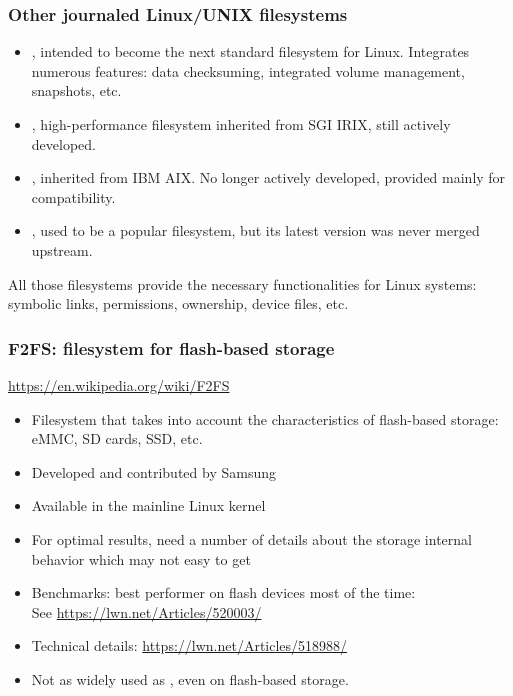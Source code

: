 \begin{frame}
  \frametitle{Other journaled Linux/UNIX filesystems}
  \begin{itemize}
  \item {}, intended to become the next standard filesystem
    for Linux. Integrates numerous features: data checksuming,
    integrated volume management, snapshots, etc.
  \item {}, high-performance filesystem inherited from SGI
    IRIX, still actively developed.
  \item {}, inherited from IBM AIX. No longer actively
    developed, provided mainly for compatibility.
  \item {}, used to be a popular filesystem, but its
    latest version  was never merged upstream.
  \end{itemize}
  All those filesystems provide the necessary functionalities for
  Linux systems: symbolic links, permissions, ownership, device files,
  etc.
\end{frame}

\begin{frame}
  \frametitle{F2FS: filesystem for flash-based storage}
  \url{https://en.wikipedia.org/wiki/F2FS}
  \begin{itemize}
  \item Filesystem that takes into account the characteristics of
    flash-based storage: eMMC, SD cards, SSD, etc.
  \item Developed and contributed by Samsung
  \item Available in the mainline Linux kernel
  \item For optimal results, need a number of details about the
    storage internal behavior which may not easy to get
  \item Benchmarks: best performer on flash devices most of the time: \\
        See \url{https://lwn.net/Articles/520003/}
  \item Technical details: \url{https://lwn.net/Articles/518988/}
  \item Not as widely used as , even on flash-based
    storage.
  \end{itemize}
\end{frame}

